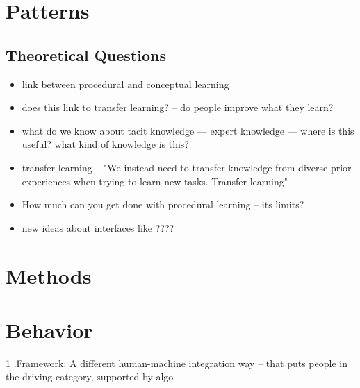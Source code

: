 

\section{Patterns} 
\subsection{Theoretical Questions}
\begin{itemize}
\item link between procedural and conceptual learning
\item does this link to transfer learning? -- do people improve what they learn?
\item what do we know about tacit knowledge — expert knowledge  --- where is this useful? what kind of knowledge is this?
\item transfer learning --  "We instead need to transfer knowledge from diverse prior experiences when trying to learn new tasks. Transfer learning"
\item How much can you get done with procedural learning -- its limits?
\item new ideas about interfaces like ????
\end{itemize}

\section{Methods} 




\section{Behavior} 






1 .Framework: A different human-machine integration way 
--  that puts people in the driving category, supported by algo
